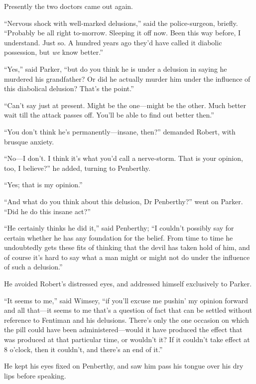 Presently the two doctors came out again.

\enquote{Nervous shock with well-marked delusions,} said the police-surgeon, briefly. \enquote{Probably be all right to-morrow. Sleeping it off now. Been this way before, I understand. Just so. A hundred years ago they'd have called it diabolic possession, but \textit{we} know better.}

\enquote{Yes,} said Parker, \enquote{but do you think he is under a delusion in saying he murdered his grandfather? Or did he actually murder him under the influence of this diabolical delusion? That's the point.}

\enquote{Can't say just at present. Might be the one\allowbreak---\allowbreak might be the other. Much better wait till the attack passes off. You'll be able to find out better then.}

\enquote{You don't think he's permanently\allowbreak---\allowbreak insane, then?} demanded Robert, with brusque anxiety.

\enquote{No\allowbreak---\allowbreak I don't. I think it's what you'd call a nerve-storm. That is your opinion, too, I believe?} he added, turning to Penberthy.

\enquote{Yes; that is my opinion.}

\enquote{And what do you think about this delusion, Dr Penberthy?} went on Parker. \enquote{Did he do this insane act?}

\enquote{He certainly thinks he did it,} said Penberthy; \enquote{I couldn't possibly say for certain whether he has any foundation for the belief. From time to time he undoubtedly gets these fits of thinking that the devil has taken hold of him, and of course it's hard to say what a man might or might not do under the influence of such a delusion.}

He avoided Robert's distressed eyes, and addressed himself exclusively to Parker.

\enquote{It seems to me,} said Wimsey, \enquote{if you'll excuse me pushin' my opinion forward and all that\allowbreak---\allowbreak it seems to me that's a question of fact that can be settled without reference to Fentiman and his delusions. There's only the one occasion on which the pill could have been administered\allowbreak---\allowbreak would it have produced the effect that was produced at that particular time, or wouldn't it? If it couldn't take effect at 8 o'clock, then it couldn't, and there's an end of it.}

He kept his eyes fixed on Penberthy, and saw him pass his tongue over his dry lips before speaking.

